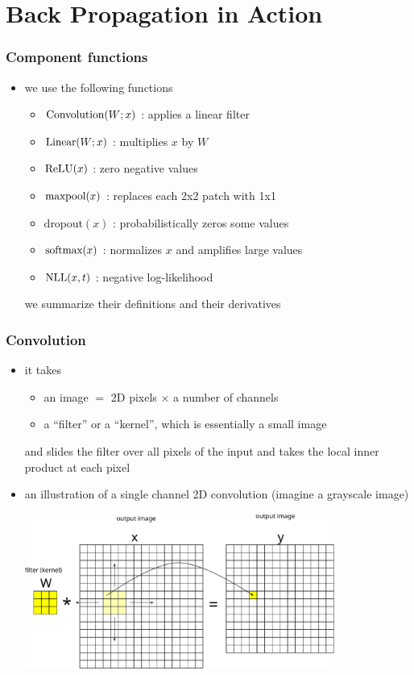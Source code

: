 \documentclass[12pt,dvipdfmx]{beamer}
\newcommand{\ao}[1]{{\color{blue}#1}}
\begin{document}
\section{Back Propagation in Action}

\begin{frame}
\frametitle{Component functions}
\begin{itemize}
\item [] we use the following functions 
  \begin{itemize}
  \item \ao{$\mbox{Convolution}(W;x)$} : applies a linear filter
  \item \ao{$\mbox{Linear}(W;x)$} : multiplies $x$ by $W$ 
  \item \ao{$\mbox{ReLU}(x)$} : zero negative values
  \item \ao{$\mbox{maxpool}(x)$} : replaces each 2x2 patch with 1x1
  \item \ao{$\mbox{dropout}(x)$} : probabilistically zeros some values 
  \item \ao{$\mbox{softmax}(x)$} : normalizes $x$ and amplifies large values
  \item \ao{$\mbox{NLL}(x, t)$} : negative log-likelihood
  \end{itemize}
  we summarize their definitions and their derivatives
\end{itemize}
\end{frame}

\begin{frame}
\frametitle{Convolution}
\begin{itemize}
\item it takes
  \begin{itemize}
  \item an image $=$ 2D pixels $\times$ a number of channels 
  \item a ``filter'' or a ``kernel'', which is essentially a small
    image
  \end{itemize}
  and slides the filter over all pixels of the input and takes the local
  inner product at each pixel
\item an illustration of a single channel 2D convolution (imagine a grayscale image)
  \begin{center}
    \includegraphics[width=0.8\textwidth]{out/pdf/svg/conv_1.pdf}
  \end{center}
\end{itemize}
\end{frame}
\end{document}
